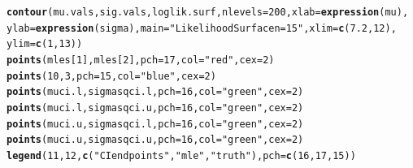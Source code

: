 \documentclass[12pt]{article}\usepackage[]{graphicx}\usepackage[]{color}
\makeatletter
\newcommand{\hlnum}[1]{\textcolor[rgb]{0.686,0.059,0.569}{#1}}%
\newcommand{\hlstr}[1]{\textcolor[rgb]{0.192,0.494,0.8}{#1}}%
\newcommand{\hlstd}[1]{\textcolor[rgb]{0.345,0.345,0.345}{#1}}%
\newcommand{\hlkwc}[1]{\textcolor[rgb]{0.333,0.667,0.333}{#1}}%
\newcommand{\hlkwd}[1]{\textcolor[rgb]{0.737,0.353,0.396}{\textbf{#1}}}%
\newenvironment{kframe}{%
 \def\at@end@of@kframe{}%
 \ifinner\ifhmode%
  \def\at@end@of@kframe{\end{minipage}}%
  \begin{minipage}{\columnwidth}%
 \fi\fi%
 \def\FrameCommand##1{\hskip\@totalleftmargin \hskip-\fboxsep
 \colorbox{shadecolor}{##1}\hskip-\fboxsep
     \hskip-\linewidth \hskip-\@totalleftmargin \hskip\columnwidth}%
 \MakeFramed {\advance\hsize-\width
   \@totalleftmargin\z@ \linewidth\hsize
   \@setminipage}}%
 {\par\unskip\endMakeFramed%
 \at@end@of@kframe}
\newenvironment{knitrout}{}{} %
\makeatother
\begin{document}
\begin{knitrout}
\begin{kframe}
\begin{alltt}
\hlkwd{contour}\hlstd{(mu.vals, sig.vals, loglik.surf,} \hlkwc{nlevels} \hlstd{=} \hlnum{200}\hlstd{,} \hlkwc{xlab} \hlstd{=} \hlkwd{expression}\hlstd{(mu),}
        \hlkwc{ylab} \hlstd{=} \hlkwd{expression}\hlstd{(sigma),} \hlkwc{main}\hlstd{=}\hlstr{"Likelihood Surface n=15"}\hlstd{,} \hlkwc{xlim}\hlstd{=}\hlkwd{c}\hlstd{(}\hlnum{7.2}\hlstd{,}\hlnum{12}\hlstd{),}
        \hlkwc{ylim}\hlstd{=}\hlkwd{c}\hlstd{(}\hlnum{1}\hlstd{,}\hlnum{13}\hlstd{))}
  \hlkwd{points}\hlstd{(mles[}\hlnum{1}\hlstd{], mles[}\hlnum{2}\hlstd{],} \hlkwc{pch}\hlstd{=}\hlnum{17}\hlstd{,} \hlkwc{col}\hlstd{=}\hlstr{"red"}\hlstd{,} \hlkwc{cex}\hlstd{=}\hlnum{2}\hlstd{)}
  \hlkwd{points}\hlstd{(}\hlnum{10}\hlstd{,} \hlnum{3}\hlstd{,} \hlkwc{pch}\hlstd{=}\hlnum{15}\hlstd{,} \hlkwc{col}\hlstd{=}\hlstr{"blue"}\hlstd{,} \hlkwc{cex}\hlstd{=}\hlnum{2}\hlstd{)}
  \hlkwd{points}\hlstd{(muci.l, sigmasqci.l,} \hlkwc{pch}\hlstd{=}\hlnum{16}\hlstd{,} \hlkwc{col}\hlstd{=}\hlstr{"green"}\hlstd{,} \hlkwc{cex}\hlstd{=}\hlnum{2}\hlstd{)}
  \hlkwd{points}\hlstd{(muci.l, sigmasqci.u,} \hlkwc{pch}\hlstd{=}\hlnum{16}\hlstd{,} \hlkwc{col}\hlstd{=}\hlstr{"green"}\hlstd{,} \hlkwc{cex}\hlstd{=}\hlnum{2}\hlstd{)}
  \hlkwd{points}\hlstd{(muci.u, sigmasqci.l,} \hlkwc{pch}\hlstd{=}\hlnum{16}\hlstd{,} \hlkwc{col}\hlstd{=}\hlstr{"green"}\hlstd{,} \hlkwc{cex}\hlstd{=}\hlnum{2}\hlstd{)}
  \hlkwd{points}\hlstd{(muci.u, sigmasqci.u,} \hlkwc{pch}\hlstd{=}\hlnum{16}\hlstd{,} \hlkwc{col}\hlstd{=}\hlstr{"green"}\hlstd{,} \hlkwc{cex}\hlstd{=}\hlnum{2}\hlstd{)}
  \hlkwd{legend}\hlstd{(}\hlnum{11}\hlstd{,}\hlnum{12}\hlstd{,} \hlkwd{c}\hlstd{(}\hlstr{"CI endpoints"}\hlstd{,} \hlstr{"mle"}\hlstd{,} \hlstr{"truth"}\hlstd{),} \hlkwc{pch}\hlstd{=}\hlkwd{c}\hlstd{(}\hlnum{16}\hlstd{,} \hlnum{17}\hlstd{,} \hlnum{15}\hlstd{))}
\end{alltt}
\end{kframe}
\end{knitrout}
\end{document}

